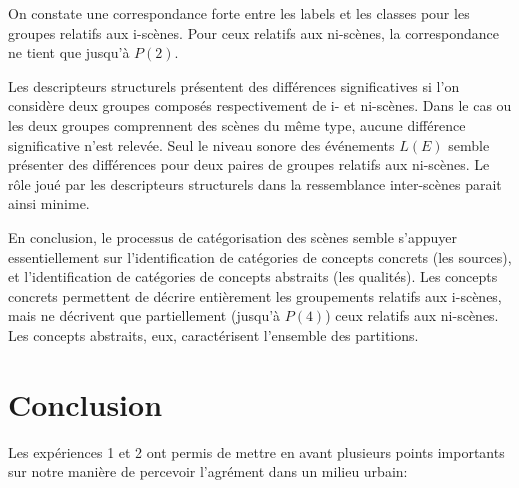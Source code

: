 On constate une correspondance forte entre les labels et les classes pour les groupes relatifs aux i-scènes. Pour ceux relatifs aux ni-scènes, la correspondance ne tient que jusqu'à $P(2)$.

Les descripteurs structurels présentent des différences significatives si l'on considère deux groupes composés respectivement de i- et ni-scènes. Dans le cas ou les deux groupes comprennent des scènes du même type, aucune différence significative n'est relevée. Seul le niveau sonore des événements $L(E)$ semble présenter des différences pour deux paires de groupes relatifs aux ni-scènes. Le rôle joué par les descripteurs structurels dans la ressemblance inter-scènes parait ainsi minime.

En conclusion, le processus de catégorisation des scènes semble s'appuyer essentiellement sur l'identification de catégories de concepts concrets (les sources), et l'identification de catégories de concepts abstraits (les qualités). Les concepts concrets permettent de décrire entièrement les groupements relatifs aux i-scènes, mais ne décrivent que partiellement (jusqu'à $P(4)$) ceux relatifs aux ni-scènes. Les concepts abstraits, eux, caractérisent l'ensemble des partitions.


\section{Conclusion}

Les expériences 1 et 2 ont permis de mettre en avant plusieurs points importants sur notre manière de percevoir l'agrément dans un milieu urbain:

